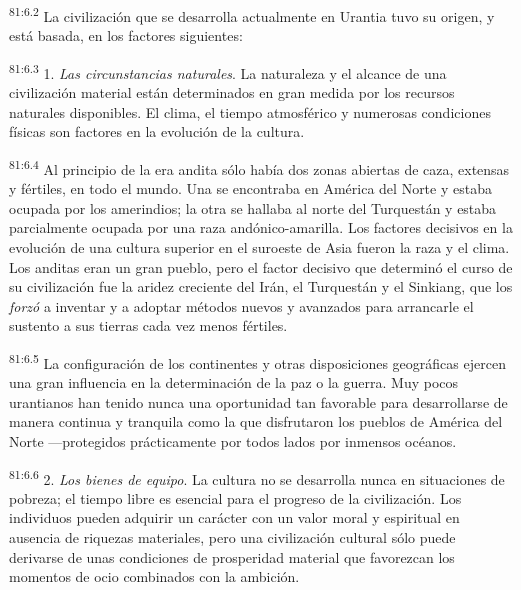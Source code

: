 \documentclass[twoside, 11pt]{book}
\begin{document}
\par
\textsuperscript{81:6.2} La civilización que se desarrolla actualmente en Urantia tuvo su origen, y está basada, en los factores siguientes:

\par
\textsuperscript{81:6.3} 1. \textit{Las circunstancias naturales}. La naturaleza y el alcance de una civilización material están determinados en gran medida por los recursos naturales disponibles. El clima, el tiempo atmosférico y numerosas condiciones físicas son factores en la evolución de la cultura.

\par
\textsuperscript{81:6.4} Al principio de la era andita sólo había dos zonas abiertas de caza, extensas y fértiles, en todo el mundo. Una se encontraba en América del Norte y estaba ocupada por los amerindios; la otra se hallaba al norte del Turquestán y estaba parcialmente ocupada por una raza andónico-amarilla. Los factores decisivos en la evolución de una cultura superior en el suroeste de Asia fueron la raza y el clima. Los anditas eran un gran pueblo, pero el factor decisivo que determinó el curso de su civilización fue la aridez creciente del Irán, el Turquestán y el Sinkiang, que los \textit{forzó} a inventar y a adoptar métodos nuevos y avanzados para arrancarle el sustento a sus tierras cada vez menos fértiles.

\par
\textsuperscript{81:6.5} La configuración de los continentes y otras disposiciones geográficas ejercen una gran influencia en la determinación de la paz o la guerra. Muy pocos urantianos han tenido nunca una oportunidad tan favorable para desarrollarse de manera continua y tranquila como la que disfrutaron los pueblos de América del Norte ---protegidos prácticamente por todos lados por inmensos océanos.

\par
\textsuperscript{81:6.6} 2. \textit{Los bienes de equipo}. La cultura no se desarrolla nunca en situaciones de pobreza; el tiempo libre es esencial para el progreso de la civilización. Los individuos pueden adquirir un carácter con un valor moral y espiritual en ausencia de riquezas materiales, pero una civilización cultural sólo puede derivarse de unas condiciones de prosperidad material que favorezcan los momentos de ocio combinados con la ambición.
\end{document}
